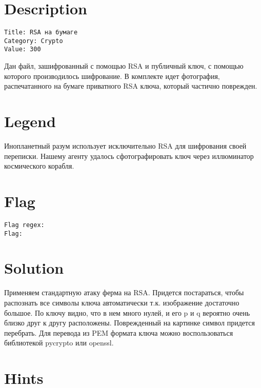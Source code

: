 \documentclass{article}
\begin{document}
	
\renewcommand{\contentsname}{Contents}

\section{Description}

\tt Title: RSA на бумаге \\

\tt Category: Crypto \\

\tt Value: 300

\begin{framed}
	Дан файл, зашифрованный с помощью RSA и публичный ключ, с помощью которого производилось шифрование. В комплекте идет фотография, распечатанного на бумаге приватного RSA ключа, который частично поврежден.
\end{framed}

\section{Legend}

\begin{framed}
	Инопланетный разум использует исключительно RSA для шифрования своей переписки. Нашему агенту удалось сфотографировать ключ через иллюминатор космического корабля.
\end{framed}

\section{Flag}

\tt Flag regex: 
 \\

\tt Flag: 

\section{Solution}

Применяем стандартную атаку ферма на RSA. Придется постараться, чтобы распознать все символы ключа автоматически т.к. изображение достаточно большое. По ключу видно, что в нем много нулей, и его p и q вероятно очень близко друг к другу расположены. Поврежденный на картинке символ придется перебрать.
Для перевода из PEM формата ключа можно воспользоваться библиотекой pycrypto или openssl.

\section{Hints}
\end{document}
